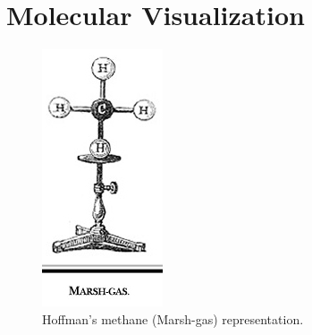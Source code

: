 \section{Molecular Visualization}
\begin{figure} 
\vspace{-27pt}
  \begin{center}
  \includegraphics[width=0.8\linewidth]{pictures/04_hoffman.jpg} 
  \caption{Hoffman's methane (Marsh-gas) representation.}
  \label{Fig:hoffman}  
\end{center}
  \vspace{-15pt}
\end{figure}

